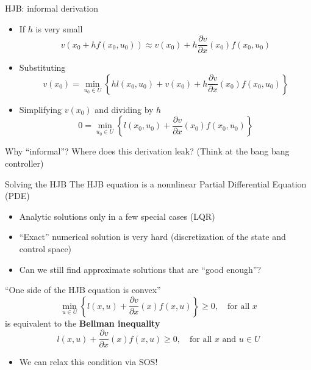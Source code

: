 \documentclass[aspectratio=169]{beamer}
\begin{document}
\begin{frame}{HJB: informal derivation}
\begin{itemize}
\item
If $h$ is very small
$$
v(x_0 + h f(x_0, u_0)) \approx v(x_0) + h \frac{\partial v}{\partial x} (x_0) f(x_0, u_0)
$$
\item
Substituting
$$
v(x_0) = \min_{u_0 \in U} \left\{ h l(x_0, u_0) +  v(x_0) + h \frac{\partial v}{\partial x} (x_0) f(x_0, u_0) \right\}
$$
\item
Simplifying $v(x_0)$ and dividing by $h$
$$
0 = \min_{u_0 \in U} \left\{ l(x_0, u_0) + \frac{\partial v}{\partial x} (x_0) f(x_0, u_0) \right\}
$$
\end{itemize}
Why ``informal''? Where does this derivation leak? (Think at the bang bang controller)
\end{frame}

\begin{frame}{Solving the HJB}
The HJB equation is a nonnlinear Partial Differential Equation (PDE)
\begin{itemize}
\item
Analytic solutions only in a few special cases (LQR)
\item
``Exact'' numerical solution is very hard (discretization of the state and control space)
\item
Can we still find approximate solutions that are ``good enough''?
\end{itemize}

\begin{block}{``One side of the HJB equation is convex''}
$$
\min_{u \in U} \left\{ l(x, u) + \frac{\partial v}{\partial x} (x) f(x, u) \right\} \geq 0, \quad \text{for all } x
$$
is equivalent to the \textbf{Bellman inequality}
$$
l(x, u) + \frac{\partial v}{\partial x} (x) f(x, u) \geq 0, \quad \text{for all } x \text{ and } u \in U
$$
\vspace{-5mm}
\begin{itemize}
\item
We can relax this condition via SOS!
\end{itemize}
\end{block}
\end{frame}
\end{document}
